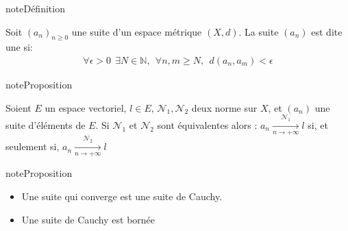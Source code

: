 \documentclass[letterpaper,10pt,french]{sphinxmanual}
\begin{document}
\begin{sphinxadmonition}{note}{Définition}

\sphinxAtStartPar
Soit \((a_n)_{n\geq 0}\) une suite d’un espace métrique \((X, d)\). La suite \((a_n)\) est dite une  si:
\begin{equation*}
\begin{split}
\forall \epsilon > 0 ~~ \exists N \in \mathbb N, ~~ \forall n, m \geq N, ~~ d(a_n, a_m) < \epsilon
\end{split}
\end{equation*}\end{sphinxadmonition}

\begin{sphinxadmonition}{note}{Proposition}

\sphinxAtStartPar
Soient \(E\) un espace vectoriel, \(l\in E\), \(\mathcal N_1, \mathcal N_2\) deux norme sur \(X\), et \((a_n)\) une suite d’éléments de \(E\). Si \(\mathcal N_1\) et \(\mathcal N_2\) sont équivalentes alors : \(a_n \underset{n \to +\infty}{\overset{\mathcal N_1}{\longrightarrow}}l\) si, et seulement si, \(a_n \underset{n \to +\infty}{\overset{\mathcal N_2}{\longrightarrow}}l\)
\end{sphinxadmonition}

\begin{sphinxadmonition}{note}{Proposition}
\begin{itemize}
\item {} 
\sphinxAtStartPar
Une suite qui converge est une suite de Cauchy.

\item {} 
\sphinxAtStartPar
Une suite de Cauchy est bornée

\end{itemize}
\end{sphinxadmonition}
\end{document}
